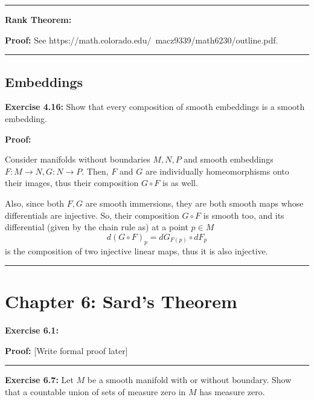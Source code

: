 \documentclass{article}
\begin{document}
\vskip 0.5cm
\hrule
\vskip 0.5cm

\textbf{Rank Theorem:} 
\vskip 0.5cm

\textbf{Proof:}
See https://math.colorado.edu/~macz9339/math6230/outline.pdf.


\vskip 0.5cm
\hrule
\vskip 0.5cm

\subsection{Embeddings}

\textbf{Exercise 4.16:} Show that every composition of smooth embeddings is a smooth embedding. 
\vskip 0.5cm

\textbf{Proof:}


Consider manifolds without boundaries $M, N, P$ and smooth embeddings $F : M \rightarrow N, G : N \rightarrow P$. Then, $F$ and $G$ are individually homeomorphisms onto their images, thus their composition $G \circ F$ is as well. 

\vskip 0.25cm
Also, since both $F, G$ are smooth immersions, they are both smooth maps whose differentials are injective. So, their composition $G \circ F$ is smooth too, and its differential (given by the chain rule as) at a point $p \in M$
\[ d\left(G \circ F\right)_{p} = dG_{F(p)} \circ dF_{p} \]
is the composition of two injective linear maps, thus it is also injective.

\vskip 0.5cm
\hrule
\vskip 0.5cm

\pagebreak

\section{Chapter 6: Sard's Theorem}


\textbf{Exercise 6.1:} 
\vskip 0.5cm

\textbf{Proof:}
[Write formal proof later]


\vskip 0.5cm
\hrule
\vskip 0.5cm



\textbf{Exercise 6.7:} Let $M$ be a smooth manifold with or without boundary. Show that a countable union of sets of measure zero in $M$ has measure zero.
\vskip 0.5cm
\end{document}
